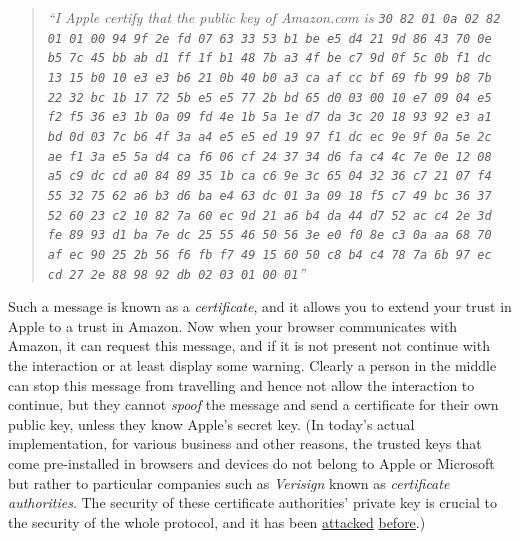 \begin{quote}
\emph{``I Apple certify that the public key of Amazon.com is
\texttt{30 82 01 0a 02 82 01 01 00 94 9f 2e fd 07 63 33 53 b1 be e5 d4 21 9d 86 43 70 0e b5 7c 45 bb ab d1 ff 1f b1 48 7b a3 4f be c7 9d 0f 5c 0b f1 dc 13 15 b0 10 e3 e3 b6 21 0b 40 b0 a3 ca af cc bf 69 fb 99 b8 7b 22 32 bc 1b 17 72 5b e5 e5 77 2b bd 65 d0 03 00 10 e7 09 04 e5 f2 f5 36 e3 1b 0a 09 fd 4e 1b 5a 1e d7 da 3c 20 18 93 92 e3 a1 bd 0d 03 7c b6 4f 3a a4 e5 e5 ed 19 97 f1 dc ec 9e 9f 0a 5e 2c ae f1 3a e5 5a d4 ca f6 06 cf 24 37 34 d6 fa c4 4c 7e 0e 12 08 a5 c9 dc cd a0 84 89 35 1b ca c6 9e 3c 65 04 32 36 c7 21 07 f4 55 32 75 62 a6 b3 d6 ba e4 63 dc 01 3a 09 18 f5 c7 49 bc 36 37 52 60 23 c2 10 82 7a 60 ec 9d 21 a6 b4 da 44 d7 52 ac c4 2e 3d fe 89 93 d1 ba 7e dc 25 55 46 50 56 3e e0 f0 8e c3 0a aa 68 70 af ec 90 25 2b 56 f6 fb f7 49 15 60 50 c8 b4 c4 78 7a 6b 97 ec cd 27 2e 88 98 92 db 02 03 01 00 01}''}
\end{quote}

Such a message is known as a \emph{certificate}, and it allows you to
extend your trust in Apple to a trust in Amazon. Now when your browser
communicates with Amazon, it can request this message, and if it is not
present not continue with the interaction or at least display some
warning. Clearly a person in the middle can stop this message from
travelling and hence not allow the interaction to continue, but they
cannot \emph{spoof} the message and send a certificate for their own
public key, unless they know Apple's secret key. (In today's actual
implementation, for various business and other reasons, the trusted keys
that come pre-installed in browsers and devices do not belong to Apple
or Microsoft but rather to particular companies such as \emph{Verisign}
known as \emph{certificate authorities}. The security of these
certificate authorities' private key is crucial to the security of the
whole protocol, and it has been
\href{https://en.wikipedia.org/wiki/DigiNotar}{attacked}
\href{http://www.wired.com/2011/10/son-of-stuxnet-in-the-wild/}{before}.)


